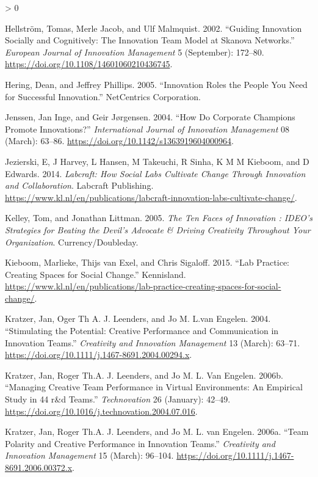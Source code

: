 \documentclass[AMA,STIX1COL,APA,STIX2COL]{WileyNJD-v2}
\newlength{\cslhangindent}
\newenvironment{CSLReferences}[2] %
 {%
  \setlength{\parindent}{0pt}
  \ifodd #1 \everypar{\setlength{\hangindent}{\cslhangindent}}\ignorespaces\fi
  \ifnum #2 > 0
  \setlength{\parskip}{#2\baselineskip}
  \fi
 }%
 {}
\begin{document}
\begin{CSLReferences}{1}{0}
\leavevmode\hypertarget{ref-Hellstrom2002}{}%
Hellström, Tomas, Merle Jacob, and Ulf Malmquist. 2002. {``Guiding
Innovation Socially and Cognitively: The Innovation Team Model at
Skanova Networks.''} \emph{European Journal of Innovation Management} 5
(September): 172--80. \url{https://doi.org/10.1108/14601060210436745}.

\leavevmode\hypertarget{ref-Hering2005}{}%
Hering, Dean, and Jeffrey Phillips. 2005. {``Innovation Roles the People
You Need for Successful Innovation.''} NetCentrics Corporation.

\leavevmode\hypertarget{ref-Jenssen2004}{}%
Jenssen, Jan Inge, and Geir Jørgensen. 2004. {``How Do Corporate
Champions Promote Innovations?''} \emph{International Journal of
Innovation Management} 08 (March): 63--86.
\url{https://doi.org/10.1142/s1363919604000964}.

\leavevmode\hypertarget{ref-Jezierski2014}{}%
Jezierski, E, J Harvey, L Hansen, M Takeuchi, R Sinha, K M M Kieboom,
and D Edwards. 2014. \emph{Labcraft: How Social Labs Cultivate Change
Through Innovation and Collaboration}. Labcraft Publishing.
\url{https://www.kl.nl/en/publications/labcraft-innovation-labs-cultivate-change/}.

\leavevmode\hypertarget{ref-Kelley2005}{}%
Kelley, Tom, and Jonathan Littman. 2005. \emph{The Ten Faces of
Innovation : IDEO's Strategies for Beating the Devil's Advocate \&
Driving Creativity Throughout Your Organization}. Currency/Doubleday.

\leavevmode\hypertarget{ref-Kieboom2015}{}%
Kieboom, Marlieke, Thijs van Exel, and Chris Sigaloff. 2015. {``Lab
Practice: Creating Spaces for Social Change.''} Kennisland.
\url{https://www.kl.nl/en/publications/lab-practice-creating-spaces-for-social-change/}.

\leavevmode\hypertarget{ref-Kratzer2004}{}%
Kratzer, Jan, Oger Th A. J. Leenders, and Jo M. L.van Engelen. 2004.
{``Stimulating the Potential: Creative Performance and Communication in
Innovation Teams.''} \emph{Creativity and Innovation Management} 13
(March): 63--71. \url{https://doi.org/10.1111/j.1467-8691.2004.00294.x}.

\leavevmode\hypertarget{ref-Kratzer2006-A}{}%
Kratzer, Jan, Roger Th.A. J. Leenders, and Jo M. L. Van Engelen. 2006b.
{``Managing Creative Team Performance in Virtual Environments: An
Empirical Study in 44 r\&d Teams.''} \emph{Technovation} 26 (January):
42--49. \url{https://doi.org/10.1016/j.technovation.2004.07.016}.

\leavevmode\hypertarget{ref-Kratzer2006-B}{}%
Kratzer, Jan, Roger Th.A. J. Leenders, and Jo M. L. van Engelen. 2006a.
{``Team Polarity and Creative Performance in Innovation Teams.''}
\emph{Creativity and Innovation Management} 15 (March): 96--104.
\url{https://doi.org/10.1111/j.1467-8691.2006.00372.x}.


\end{CSLReferences}
\end{document}
